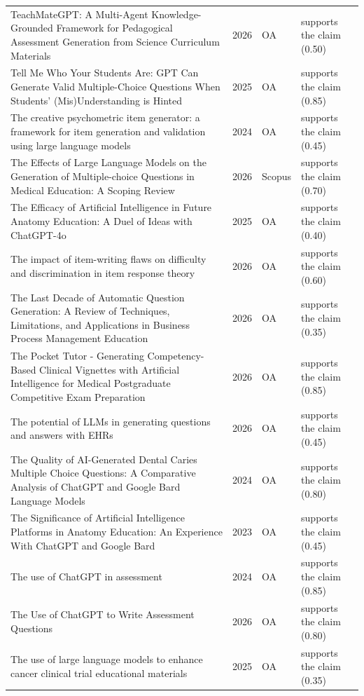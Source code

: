 \begin{longtable}{@{}%
  >{\raggedright\arraybackslash}p{}c%
  >{\raggedright\arraybackslash}p{}%
  >{\raggedright\arraybackslash}p{}@{}}
TeachMateGPT: A Multi-Agent Knowledge-Grounded Framework for Pedagogical Assessment Generation from Science Curriculum Materials & 2026 & OA & supports the claim (0.50) \\
Tell Me Who Your Students Are: GPT Can Generate Valid Multiple-Choice Questions When Students' (Mis)Understanding is Hinted & 2025 & OA & supports the claim (0.85) \\
The creative psychometric item generator: a framework for item generation and validation using large language models & 2024 & OA & supports the claim (0.45) \\
The Effects of Large Language Models on the Generation of Multiple-choice Questions in Medical Education: A Scoping Review & 2026 & Scopus & supports the claim (0.70) \\
The Efficacy of Artificial Intelligence in Future Anatomy Education: A Duel of Ideas with ChatGPT-4o & 2025 & OA & supports the claim (0.40) \\
The impact of item-writing flaws on difficulty and discrimination in item response theory & 2026 & OA & supports the claim (0.60) \\
The Last Decade of Automatic Question Generation: A Review of Techniques, Limitations, and Applications in Business Process Management Education & 2026 & OA & supports the claim (0.35) \\
The Pocket Tutor - Generating Competency-Based Clinical Vignettes with Artificial Intelligence for Medical Postgraduate Competitive Exam Preparation & 2026 & OA & supports the claim (0.85) \\
The potential of LLMs in generating questions and answers with EHRs & 2026 & OA & supports the claim (0.45) \\
The Quality of AI-Generated Dental Caries Multiple Choice Questions: A Comparative Analysis of ChatGPT and Google Bard Language Models & 2024 & OA & supports the claim (0.80) \\
The Significance of Artificial Intelligence Platforms in Anatomy Education: An Experience With ChatGPT and Google Bard & 2023 & OA & supports the claim (0.45) \\
The use of ChatGPT in assessment & 2024 & OA & supports the claim (0.85) \\
The Use of ChatGPT to Write Assessment Questions & 2026 & OA & supports the claim (0.80) \\
The use of large language models to enhance cancer clinical trial educational materials & 2025 & OA & supports the claim (0.35) \\

\end{longtable}
